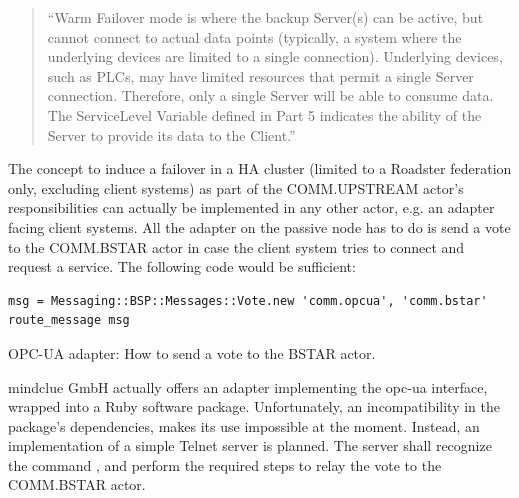 \begin{quote}
``Warm Failover mode is where the backup Server(s) can be active, but cannot
connect to actual data points (typically, a system where the underlying devices
are limited to a single connection). Underlying devices, such as PLCs, may have
limited resources that permit a single Server connection. Therefore, only a
single Server will be able to consume data. The ServiceLevel Variable defined
in Part 5 indicates the ability of the Server to provide its data to the
Client.''
\end{quote}

The concept to induce a failover in a \gls{HA} cluster (limited to a
Roadster federation only, excluding client systems) as part of the
COMM.UPSTREAM actor's responsibilities can actually be implemented in any other
actor, e.g. an adapter facing client systems. All the adapter on the passive
node has to do is send a vote to the COMM.BSTAR actor in case the client system
tries to connect and request a service. The following code would be sufficient:

\begin{listing}[H]
  \begin{verbatim}
msg = Messaging::BSP::Messages::Vote.new 'comm.opcua', 'comm.bstar'
route_message msg
  \end{verbatim}
  \caption{OPC-UA adapter: How to send a vote to the BSTAR actor.}
  \label{lst:approach:opc-ua}
\end{listing}

mindclue GmbH actually offers an adapter implementing the \gls{opc-ua}
interface, wrapped into a Ruby software package. Unfortunately, an
incompatibility in the package's dependencies, makes its use impossible at the
moment. Instead, an implementation of a simple Telnet server is planned. The
server shall recognize the command , and perform the required steps to
relay the vote to the COMM.BSTAR actor.
